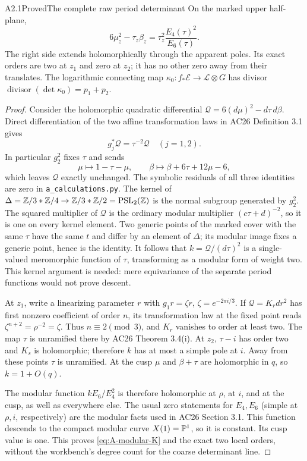 \begin{claim}{A2.1}{Proved}{The complete raw period determinant}
On the marked upper half-plane,
\begin{equation}\label{eq:A-modular-K}
6\mu_z^2-\tau_z\beta_z
=\tau_z^2\frac{E_4(\tau)^2}{E_6(\tau)}.
\end{equation}
The right side extends holomorphically through the apparent poles.
Its exact orders are two at $z_1$ and zero at $z_2$; it has no other
zero away from their translates.  The logarithmic connecting map
$\kappa_0:f_*\mathcal E\to\mathcal L\otimes G$ has divisor
$\operatorname{divisor}(\det\kappa_0)=p_1+p_2$.
\end{claim}
\begin{proof}
Consider the holomorphic quadratic differential
$\mathscr Q=6(d\mu)^2-d\tau\,d\beta$.  Direct differentiation of
the two affine transformation laws in AC26 Definition 3.1 gives
\[
g_j^*\mathscr Q=\tau^{-2}\mathscr Q\quad(j=1,2).
\]
In particular $g_2^2$ fixes $\tau$ and sends
\[
\mu\longmapsto1-\tau-\mu,\qquad
\beta\longmapsto\beta+6\tau+12\mu-6,
\]
which leaves $\mathscr Q$ exactly unchanged.  The symbolic residuals
of all three identities are zero in \texttt{a\_calculations.py}.
The kernel of
$\Delta=\mathbb Z/3*\mathbb Z/4\to\mathbb Z/3*\mathbb Z/2=\operatorname{PSL}_2(\mathbb Z)$
is the normal subgroup generated by $g_2^2$.  The squared multiplier
of $\mathscr Q$ is the ordinary modular multiplier
$(c\tau+d)^{-2}$, so it is one on every kernel element.  Two generic
points of the marked cover with the same $\tau$ have the same $t$
and differ by an element of $\Delta$; its modular image fixes a
generic point, hence is the identity.  It follows that
$k=\mathscr Q/(d\tau)^2$ is a single-valued meromorphic function of
$\tau$, transforming as a modular form of weight two.  This kernel
argument is needed: mere equivariance of the separate period functions
would not prove descent.

At $z_1$, write a linearizing parameter $r$ with
$g_1r=\zeta r$, $\zeta=e^{-2\pi i/3}$.  If $\mathscr Q=K_rdr^2$
has first nonzero coefficient of order $n$, its transformation law
at the fixed point reads $\zeta^{n+2}=\rho^{-2}=\zeta$.
Thus $n\equiv2\pmod3$, and $K_r$ vanishes to order at least two.
The map $\tau$ is unramified there by AC26 Theorem 3.4(i).  At
$z_2$, $\tau-i$ has order two and $K_s$ is holomorphic; therefore
$k$ has at most a simple pole at $i$.  Away from these points
$\tau$ is unramified.  At the cusp $\mu$ and $\beta+\tau$ are
holomorphic in $q$, so $k=1+O(q)$.

The modular function $k E_6/E_4^2$ is therefore holomorphic at
$\rho$, at $i$, and at the cusp, as well as everywhere else.
The usual zero statements for $E_4,E_6$ (simple at $\rho,i$,
respectively) are the modular facts used in AC26 Section 3.1.
This function descends to the compact modular curve $X(1)=\mathbb P^1$,
so it is constant.  Its cusp value is one.  This proves
\eqref{eq:A-modular-K} and the exact two local orders, without the
workbench's degree count for the coarse determinant line.


\end{proof}
